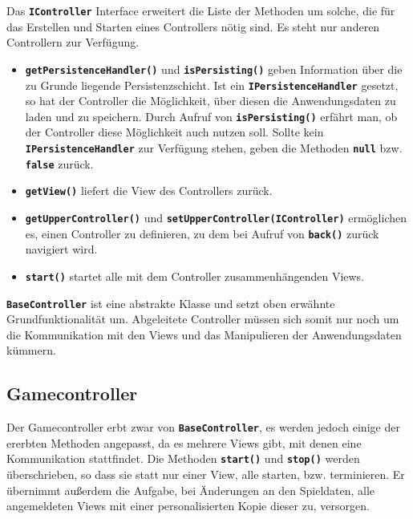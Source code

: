 \documentclass[
							a4paper, 
							11pt, 
							openany, 
							liststotoc,
							parskip=half, 
   							headings=normal
						]{scrreprt}
\begin{document}
{Das \textbf{\texttt{IController}} Interface erweitert die Liste der Methoden um solche, die für das Erstellen und Starten eines Controllers nötig sind. Es steht nur anderen Controllern zur Verfügung.
\begin{itemize}
	\item \textbf{\texttt{getPersistenceHandler()}} und \textbf{\texttt{isPersisting()}} geben Information über die zu Grunde liegende Persistenzschicht. Ist ein \textbf{\texttt{IPersistenceHandler}} gesetzt, so hat der Controller die Möglichkeit, über diesen die Anwendungsdaten zu laden und zu speichern. Durch Aufruf von \textbf{\texttt{isPersisting()}} erfährt man, ob der Controller diese Möglichkeit auch nutzen soll. Sollte kein \textbf{\texttt{IPersistenceHandler}} zur Verfügung stehen, geben die Methoden  \textbf{\texttt{null}} bzw. \textbf{\texttt{false}} zurück.
	\item \textbf{\texttt{getView()}} liefert die View des Controllers zurück.
	\item \textbf{\texttt{getUpperController()}} und \textbf{\texttt{setUpperController(IController)}} ermöglichen es, einen Controller zu definieren, zu dem bei Aufruf von \textbf{\texttt{back()}} zurück navigiert wird.
	\item \textbf{\texttt{start()}} startet alle mit dem Controller zusammenhängenden Views.
\end{itemize}\bigskip

\textbf{\texttt{BaseController}} ist eine abstrakte Klasse und setzt oben erwähnte Grundfunktionalität um. Abgeleitete Controller müssen sich somit nur noch um die Kommunikation mit den Views und das Manipulieren der Anwendungsdaten kümmern.


\subsection{Gamecontroller} \label{sse:anwendung_controller_game}
Der Gamecontroller erbt zwar von \textbf{\texttt{BaseController}}, es werden jedoch einige der ererbten Methoden angepasst, da es mehrere Views gibt, mit denen eine Kommunikation stattfindet. Die Methoden \textbf{\texttt{start()}} und \textbf{\texttt{stop()}} werden überschrieben, so dass sie statt nur einer View, alle starten, bzw. terminieren. Er übernimmt außerdem die Aufgabe, bei Änderungen an den Spieldaten, alle angemeldeten Views mit einer personalisierten Kopie dieser zu, versorgen.

}
\end{document}
